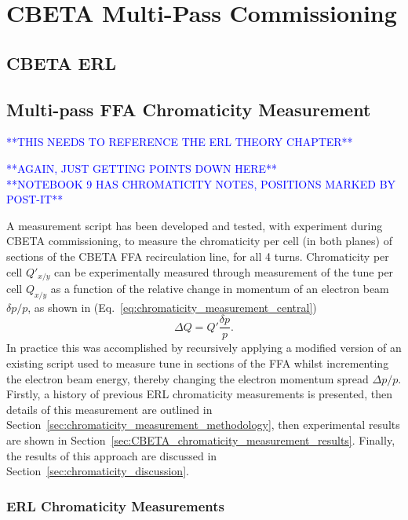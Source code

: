 \documentclass[../main.tex]{subfiles}
\begin{document}
\chapter{CBETA Multi-Pass Commissioning}
\label{CBETA_Multi-Pass_Commissioning} %

\section{CBETA ERL}


\section{Multi-pass FFA Chromaticity Measurement}

\textcolor{blue}{**THIS NEEDS TO REFERENCE THE ERL THEORY CHAPTER**}

\textcolor{blue}{**AGAIN, JUST GETTING POINTS DOWN HERE** \\ **NOTEBOOK 9 HAS CHROMATICITY NOTES, POSITIONS MARKED BY POST-IT**}

A measurement script has been developed and tested, with experiment during CBETA commissioning, to measure the chromaticity per cell (in both planes) of sections of the CBETA FFA recirculation line, for all 4 turns. Chromaticity per cell $Q'_{x/y}$ can be experimentally measured through measurement of the tune per cell $Q_{x/y}$ as a function of the relative change in momentum of an electron beam $\delta p/p$, as shown in (Eq.~\ref{eq:chromaticity_measurement_central})
\begin{equation}
\Delta Q = Q'\frac{\delta p}{p}.
\label{eq:chromaticity_measurement_central}
\end{equation}
In practice this was accomplished by recursively applying a modified version of an existing script used to measure tune in sections of the FFA whilst incrementing the electron beam energy, thereby changing the electron momentum spread $\Delta p/p$. Firstly, a history of previous ERL chromaticity measurements is presented, then details of this measurement are outlined in Section~\ref{sec:chromaticity_measurement_methodology}, then experimental results are shown in Section~\ref{sec:CBETA_chromaticity_measurement_results}. Finally, the results of this approach are discussed in Section~\ref{sec:chromaticity_discussion}. 

\subsection{ERL Chromaticity Measurements}
\label{sec:ERL_chromaticity_measurements}
\end{document}
